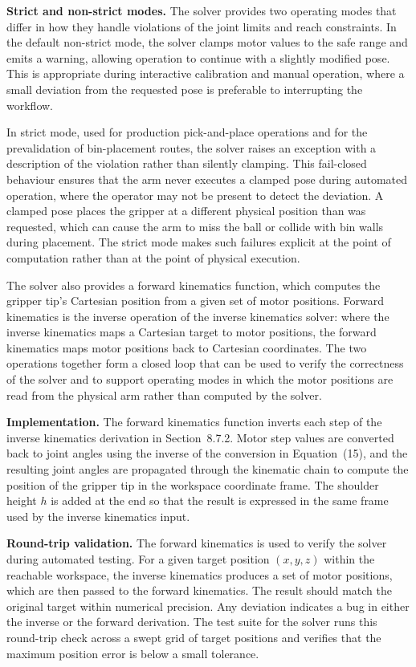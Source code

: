 \textbf{Strict and non-strict modes.} The solver provides two 
operating modes that differ in how they handle violations of 
the joint limits and reach constraints. In the default 
non-strict mode, the solver clamps motor values to the safe 
range and emits a warning, allowing operation to continue with a 
slightly modified pose. This is appropriate during interactive 
calibration and manual operation, where a small deviation from 
the requested pose is preferable to interrupting the workflow.

In strict mode, used for production pick-and-place operations 
and for the prevalidation of bin-placement routes, the solver 
raises an exception with a description of the violation rather 
than silently clamping. This fail-closed behaviour ensures that 
the arm never executes a clamped pose during automated operation, 
where the operator may not be present to detect the deviation. 
A clamped pose places the gripper at a different physical 
position than was requested, which can cause the arm to miss the 
ball or collide with bin walls during placement. The strict mode 
makes such failures explicit at the point of computation rather 
than at the point of physical execution.


The solver also provides a forward kinematics function, which 
computes the gripper tip's Cartesian position from a given set of 
motor positions. Forward kinematics is the inverse operation of 
the inverse kinematics solver: where the inverse kinematics maps 
a Cartesian target to motor positions, the forward kinematics 
maps motor positions back to Cartesian coordinates. The two 
operations together form a closed loop that can be used to 
verify the correctness of the solver and to support operating 
modes in which the motor positions are read from the physical 
arm rather than computed by the solver.

\textbf{Implementation.} The forward kinematics function inverts 
each step of the inverse kinematics derivation in 
Section~8.7.2. Motor step values are converted back to joint 
angles using the inverse of the conversion in Equation~(15), and 
the resulting joint angles are propagated through the kinematic 
chain to compute the position of the gripper tip in the workspace 
coordinate frame. The shoulder height $h$ is added at the end so 
that the result is expressed in the same frame used by the 
inverse kinematics input.

\textbf{Round-trip validation.} The forward kinematics is used 
to verify the solver during automated testing. For a given 
target position $(x, y, z)$ within the reachable workspace, the 
inverse kinematics produces a set of motor positions, which are 
then passed to the forward kinematics. The result should match 
the original target within numerical precision. Any deviation 
indicates a bug in either the inverse or the forward derivation. 
The test suite for the solver runs this round-trip check across 
a swept grid of target positions and verifies that the maximum 
position error is below a small tolerance.

